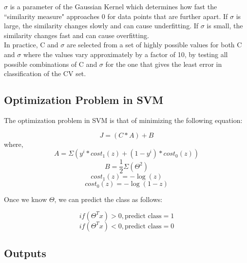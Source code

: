 \documentclass[11pt,a4paper]{report}
\begin{document}
{$\sigma$ is a parameter of the Gaussian Kernel which determines how fast the ``similarity measure" approaches 0 for data points that are further apart. If $\sigma$ is large, the similarity changes slowly and can cause underfitting. If $\sigma$ is small, the similarity changes fast and can cause overfitting.\\

In practice, C and $\sigma$ are selected from a set of highly possible values for both C and $\sigma$ where the values vary approximately by a factor of 10, by testing all possible combinations of C and $\sigma$ for the one that gives the least error in classification of the CV set.\\  

\subsection{Optimization Problem in SVM}

The optimization problem in SVM is that of minimizing the following equation:

\begin{equation}J = (C * A) + B\end{equation}
where,
\begin{equation}A = \Sigma(y^i * cost_{1}(z)  +  (1-y^i) * cost_{0}(z))\end{equation}    
\begin{equation}B = \frac{1}{2} \Sigma(\Theta^2)\end{equation}
\begin{equation}cost_{1}(z) = -\log(z)\end{equation}
\begin{equation}cost_{0}(z) = -\log(1 - z)\end{equation}

Once we know $\Theta$, we can predict the class as follows:

\begin{equation}if(\Theta^Tx) > 0, \text{predict class} = 1\end{equation}
\begin{equation}if(\Theta^Tx) < 0, \text{predict class} = 0\end{equation}

\subsection{Outputs}

}
\end{document}
